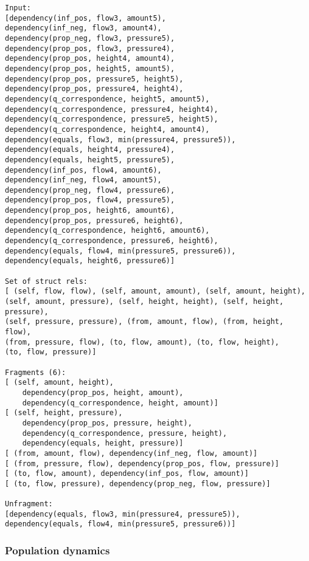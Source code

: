 \documentclass{article}
\begin{document}
\begin{verbatim}
Input:
[dependency(inf_pos, flow3, amount5), 
dependency(inf_neg, flow3, amount4), 
dependency(prop_neg, flow3, pressure5), 
dependency(prop_pos, flow3, pressure4), 
dependency(prop_pos, height4, amount4), 
dependency(prop_pos, height5, amount5), 
dependency(prop_pos, pressure5, height5), 
dependency(prop_pos, pressure4, height4), 
dependency(q_correspondence, height5, amount5), 
dependency(q_correspondence, pressure4, height4), 
dependency(q_correspondence, pressure5, height5), 
dependency(q_correspondence, height4, amount4), 
dependency(equals, flow3, min(pressure4, pressure5)), 
dependency(equals, height4, pressure4), 
dependency(equals, height5, pressure5), 
dependency(inf_pos, flow4, amount6), 
dependency(inf_neg, flow4, amount5), 
dependency(prop_neg, flow4, pressure6), 
dependency(prop_pos, flow4, pressure5), 
dependency(prop_pos, height6, amount6), 
dependency(prop_pos, pressure6, height6), 
dependency(q_correspondence, height6, amount6), 
dependency(q_correspondence, pressure6, height6), 
dependency(equals, flow4, min(pressure5, pressure6)), 
dependency(equals, height6, pressure6)]

Set of struct rels: 
[ (self, flow, flow), (self, amount, amount), (self, amount, height), 
(self, amount, pressure), (self, height, height), (self, height, pressure),
(self, pressure, pressure), (from, amount, flow), (from, height, flow), 
(from, pressure, flow), (to, flow, amount), (to, flow, height), 
(to, flow, pressure)]

Fragments (6):
[ (self, amount, height), 
	dependency(prop_pos, height, amount), 
	dependency(q_correspondence, height, amount)]
[ (self, height, pressure), 
	dependency(prop_pos, pressure, height), 
	dependency(q_correspondence, pressure, height), 
	dependency(equals, height, pressure)]
[ (from, amount, flow), dependency(inf_neg, flow, amount)]
[ (from, pressure, flow), dependency(prop_pos, flow, pressure)]
[ (to, flow, amount), dependency(inf_pos, flow, amount)]
[ (to, flow, pressure), dependency(prop_neg, flow, pressure)]

Unfragment:
[dependency(equals, flow3, min(pressure4, pressure5)), 
dependency(equals, flow4, min(pressure5, pressure6))]
\end{verbatim}


\subsubsection{Population dynamics}
\end{document}
